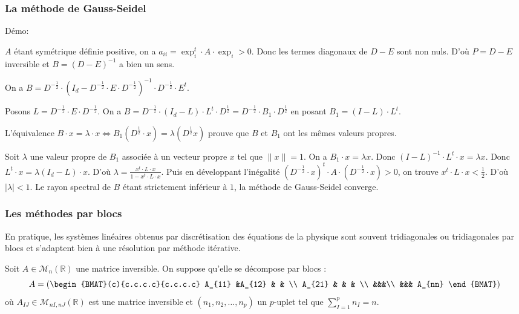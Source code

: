 \documentclass{beamer}
\begin{document}
\begin{frame}
\frametitle{La méthode de Gauss-Seidel}
Démo:

$A$ étant symétrique définie positive, on a $a_{ii} = \exp_i^t \cdot A \cdot \exp_i >0$. Donc les termes diagonaux de $D-E$ sont non nuls. D'où $P=D-E$ inversible et $B=(D-E)^{-1}$ a bien un sens.

On a $B=D^{-\frac 12} \cdot \left(I_d - D^{- \frac 12} \cdot E \cdot D^{- \frac 12} \right)^{-1} \cdot D^{- \frac 12} \cdot E^{t}$. 

Posons $L = D^{- \frac 12} \cdot E \cdot D^{- \frac 12}$. On a $B = D^{- \frac 12} \cdot (I_d - L) \cdot L^t \cdot D^{\frac 12} = D^{- \frac 12} \cdot B_1 \cdot D^{\frac 12}$ en posant $B_1=(I-L) \cdot L^t$.

L'équivalence $B \cdot x = \lambda \cdot x \Longleftrightarrow B_1 \left( D^{ \frac 12} \cdot x \right) = \lambda \left( D^{\frac 12}  x \right)$ prouve que $B$ et $B_1$ ont les mêmes valeurs propres.

Soit $\lambda$ une valeur propre de $B_1$ associée à un vecteur propre $x$ tel que $\| x \| =1$. On a $B_1 \cdot x = \lambda x$. Donc $(I-L)^{-1} \cdot L^t \cdot x = \lambda x $. Donc $L^t \cdot x = \lambda (I_d-L) \cdot x$. D'où $\lambda= \frac{x^t \cdot L \cdot x}{1-x^t \cdot L \cdot x}$. Puis en développant l'inégalité $\left(D^{- \frac 12}  \cdot x \right)^t \cdot A \cdot \left( D^{- \frac 12} \cdot x \right)>0 $, on trouve $x^t \cdot L \cdot x < \frac 12$. D'où $| \lambda | <1$. Le rayon spectral de $B$ étant strictement inférieur à $1$, la méthode de Gauss-Seidel converge.



\end{frame}


\begin{frame}
\frametitle{Les méthodes par blocs}

En pratique, les systèmes linéaires obtenus par discrétisation des équations de la physique sont souvent tridiagonales ou tridiagonales par blocs et s'adaptent bien à une résolution par méthode itérative. 

Soit $A \in \mathscr{M}_n(\mathbb{R})$ une matrice inversible. On suppose qu'elle se décompose par blocs :
\[
A=\left(
\begin{BMAT}(c){c.c.c.c}{c.c.c.c}
A_{11} &A_{12} & & \\
A_{21}  & & & \\
&&&\\
&&& A_{nn} 
\end{BMAT} \right)
\]
où $A_{IJ} \in \mathscr{M}_{nI, nJ}(\mathbb{R})$ est une matrice inversible et $(n_1, n_2, \dots, n_p)$ un $p$-uplet tel que $\sum\limits_{I=1}^p n_I=n$.
\end{frame}
\end{document}
